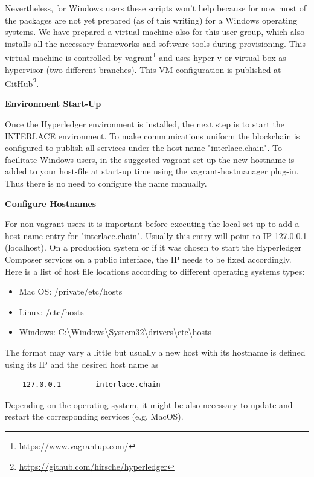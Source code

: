Nevertheless, for Windows users these scripts won't help because for now most of the packages are not yet prepared (as of this writing) for a Windows operating systems. We have prepared a virtual machine also for this user group, which also installs all the necessary frameworks and software tools during provisioning. This virtual machine is controlled by vagrant\footnote{\url{https://www.vagrantup.com/}} and uses hyper-v or virtual box as hypervisor (two different branches). This VM configuration is published at GitHub\footnote{\url{https://github.com/hirsche/hyperledger}}.

\textbf{Environment Start-Up}

Once the Hyperledger environment is installed, the next step is to start the INTERLACE environment. To make communications uniform the blockchain is configured to publish all services under the host name "interlace.chain". To facilitate Windows users, in the suggested vagrant set-up the new hostname is added to your host-file at start-up time using the vagrant-hostmanager plug-in. Thus there is no need to configure the name manually.

\textbf{Configure Hostnames}

For non-vagrant users it is important before executing the local set-up to add a host name entry for "interlace.chain". Usually this entry will point to IP 127.0.0.1 (localhost). On a production system or if it was chosen to start the Hyperledger Composer services on a public interface, the IP needs to be fixed accordingly. Here is a list of host file locations according to different operating systems types:

\begin{itemize}
	\item Mac OS: /private/etc/hosts
    \item Linux: /etc/hosts
    \item Windows: C:\textbackslash Windows\textbackslash System32\textbackslash drivers\textbackslash etc\textbackslash hosts
\end{itemize}

The format may vary a little but usually a new host with its hostname is defined using its IP and the desired host name as

\begin{lstlisting}
	127.0.0.1        interlace.chain
\end{lstlisting}
Depending on the operating system, it might be also necessary to update and restart the corresponding services (e.g. MacOS).


